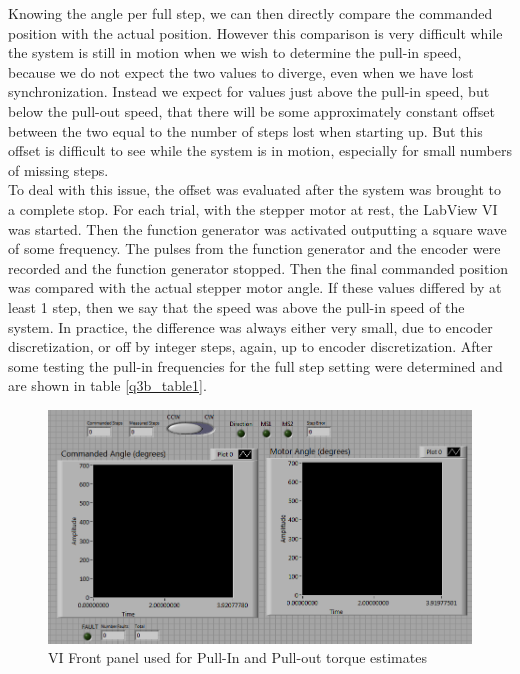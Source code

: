 \documentclass{article}
\theoremstyle{plain}
\theoremstyle{definition}
\theoremstyle{remark}
\begin{document}
Knowing the angle per full step, we can then directly compare the commanded position with the actual position.  However this comparison is very difficult while the system is still in motion when we wish to determine the pull-in speed, because we do not expect the two values to diverge, even when we have lost synchronization.  Instead we expect for values just above the pull-in speed, but below the pull-out speed, that there will be some approximately constant offset between the two equal to the number of steps lost when starting up.   But this offset is difficult to see while the system is in motion, especially for small numbers of missing steps.\\  

To deal with this issue, the offset was evaluated after the system was brought to a complete stop. For each trial, with the stepper motor at rest, the LabView VI was started.  Then the function generator was activated outputting a square wave of some frequency.  The pulses from the function generator and the encoder were recorded and the function generator stopped.  Then the final commanded position was compared with the actual stepper motor angle.  If these values differed by at least 1 step, then we say that the speed was above the pull-in speed of the system.  In practice, the difference was always either very small, due to encoder discretization, or off by integer steps, again, up to encoder discretization.  After some testing the pull-in frequencies for the full step setting were determined and are shown in table \ref{q3b_table1}.


\begin{figure}[htb]
\begin{center}
\includegraphics[width = 13cm]{ExternalSourceFront.png}
\caption{VI Front panel used for Pull-In and Pull-out torque estimates}
\label{q3b_Front}
\end{center}
\end{figure}
\end{document}
